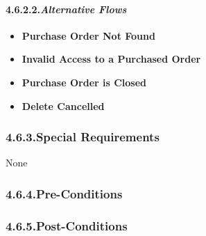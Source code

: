 \documentclass{article}
\begin{document}
\paragraph{4.6.2.2.\hspace*{0.5em}\emph{Alternative Flows}}\label{sec-_alternative-flows_}%

\begin{itemize}%

\item{}
\textbf{Purchase Order Not Found}%

\item{}
\textbf{Invalid Access to a Purchased Order}%

\item{}
\textbf{Purchase Order is Closed}%

\item{}
\textbf{Delete Cancelled}%
\end{itemize}%

\subsubsection{4.6.3.\hspace*{0.5em}Special Requirements}\label{sec-special-requirements}%

\noindent{}None%

\subsubsection{4.6.4.\hspace*{0.5em}Pre-Conditions}\label{sec-pre-conditions}%

\subsubsection{4.6.5.\hspace*{0.5em}Post-Conditions}\label{sec-post-conditions}%

\end{document}
